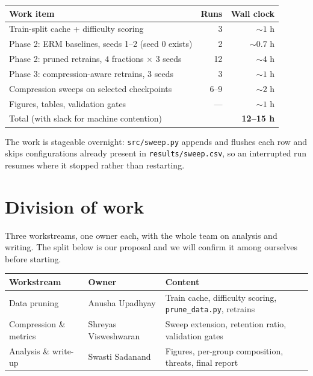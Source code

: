 \documentclass[11pt]{article}
\begin{document}
\begin{table}[h]
\centering
\small
\begin{tabular}{@{}lrr@{}}
\toprule
Work item & Runs & Wall clock \\
\midrule
Train-split cache + difficulty scoring & 3 & ${\sim}1$ h \\
Phase 2: ERM baselines, seeds 1--2 (seed 0 exists) & 2 & ${\sim}0.7$ h \\
Phase 2: pruned retrains, $4$ fractions $\times$ 3 seeds & 12 & ${\sim}4$ h \\
Phase 3: compression-aware retrains, 3 seeds & 3 & ${\sim}1$ h \\
Compression sweeps on selected checkpoints & 6--9 & ${\sim}2$ h \\
Figures, tables, validation gates & --- & ${\sim}1$ h \\
\midrule
Total (with slack for machine contention) & & \textbf{12--15 h} \\
\bottomrule
\end{tabular}
\end{table}

The work is stageable overnight: \texttt{src/sweep.py} appends and flushes each
row and skips configurations already present in \texttt{results/sweep.csv}, so an
interrupted run resumes where it stopped rather than restarting.

\section{Division of work}

Three workstreams, one owner each, with the whole team on analysis and writing.
The split below is our proposal and we will confirm it among ourselves before
starting.

\begin{table}[h]
\centering
\small
\begin{tabular}{@{}lll@{}}
\toprule
Workstream & Owner & Content \\
\midrule
Data pruning & Anusha Upadhyay & Train cache, difficulty scoring,
\texttt{prune\_data.py}, retrains \\
Compression \& metrics & Shreyas Visweshwaran & Sweep extension, retention ratio,
validation gates \\
Analysis \& write-up & Swasti Sadanand & Figures, per-group composition, threats,
final report \\
\bottomrule
\end{tabular}
\end{table}
\end{document}
